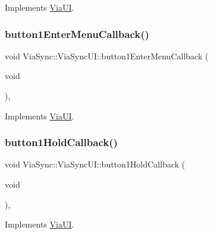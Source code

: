 Implements \mbox{\hyperlink{class_via_u_i_a0a43c527f027d11b266080d8cacb1d65}{Via\+UI}}.

\mbox{\label{class_via_sync_1_1_via_sync_u_i_a2082d2d4a5ef8cbbaa2a1d8a387b3cad}} 
\subsubsection{\texorpdfstring{button1\+Enter\+Menu\+Callback()}{button1EnterMenuCallback()}}
{\footnotesize\ttfamily void Via\+Sync\+::\+Via\+Sync\+U\+I\+::button1\+Enter\+Menu\+Callback (\begin{DoxyParamCaption}\item[{void}]{ }\end{DoxyParamCaption})\hspace{0.3cm}{\ttfamily [override]}, {\ttfamily [virtual]}}



Implements \mbox{\hyperlink{class_via_u_i_ae00249c10af94437c357222328a56f82}{Via\+UI}}.

\mbox{\label{class_via_sync_1_1_via_sync_u_i_acd1a12bdb9cc39045eee719af6d70d1c}} 
\subsubsection{\texorpdfstring{button1\+Hold\+Callback()}{button1HoldCallback()}}
{\footnotesize\ttfamily void Via\+Sync\+::\+Via\+Sync\+U\+I\+::button1\+Hold\+Callback (\begin{DoxyParamCaption}\item[{void}]{ }\end{DoxyParamCaption})\hspace{0.3cm}{\ttfamily [override]}, {\ttfamily [virtual]}}



Implements \mbox{\hyperlink{class_via_u_i_a62145ce1c1b664ff0a1aadaac9386162}{Via\+UI}}.

